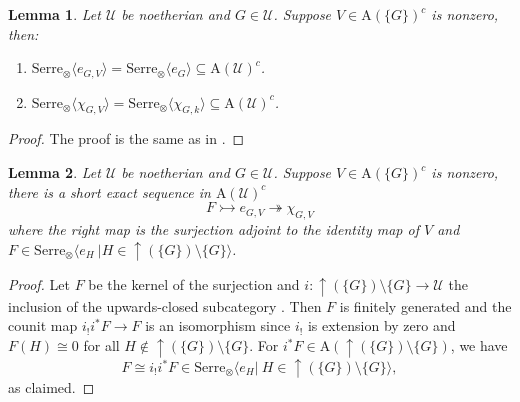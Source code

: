 \documentclass[11pt,a4paper]{amsart}
\numberwithin{equation}{section} \theoremstyle{plain}
\newtheorem{lem}{Lemma}[section]
\begin{document}
\begin{lem}\label{lem4.7} Let $\mathcal{U}$ be noetherian and $G\in \mathcal{U}$. Suppose $V\in \mathrm{A}(\{G\})^{c}$ is nonzero, then:
\begin{enumerate}
\item $\mathrm{Serre}_{\otimes}\langle e_{G,V}\rangle=\mathrm{Serre}_{\otimes}\langle e_{G}\rangle\subseteq \mathrm{A}(\mathcal{U})^{c}$.

\item $\mathrm{Serre}_{\otimes}\langle \chi_{G,V}\rangle=\mathrm{Serre}_{\otimes}\langle \chi_{G,k}\rangle\subseteq \mathrm{A}(\mathcal{U})^{c}$.

\end{enumerate}
\end{lem}
\begin{proof} The proof is the same as in \cite[Lemma 2.9, Proposition 2.11]{BBP+25b}.
\end{proof}

\begin{lem}\label{lem4.8} Let $\mathcal{U}$ be noetherian and $G\in \mathcal{U}$. Suppose $V\in \mathrm{A}(\{G\})^{c}$ is nonzero, there is a short exact sequence in $\mathrm{A}(\mathcal{U})^{c}$
$$F\rightarrowtail e_{G,V}\twoheadrightarrow \chi_{G,V}$$
where the right map is the surjection adjoint to the identity map of $V$ and $F\in \mathrm{Serre}_{\otimes}\langle e_{H}~| H\in \uparrow (\{G\})\setminus\{G\} \rangle$.
\end{lem}
\begin{proof}Let $F$ be the kernel of the surjection and $i:\uparrow (\{G\})\setminus\{G\} \rightarrow \mathcal{U}$  the inclusion of the upwards-closed subcategory . Then $F$ is finitely generated and the counit map $i_{!}i^{*}F\rightarrow F$ is an isomorphism since $i_{!}$ is extension by zero and $F(H)\cong 0$ for all $H\notin \uparrow (\{G\})\setminus\{G\}$. For $i^{*}F\in \mathrm{A}(\uparrow (\{G\})\setminus\{G\})$, we have $$F\cong i_{!}i^{*}F\in \mathrm{Serre}_{\otimes}\langle e_{H}|~H\in \uparrow (\{G\})\setminus\{G\}\rangle,$$ as claimed.
\end{proof}
\end{document}
